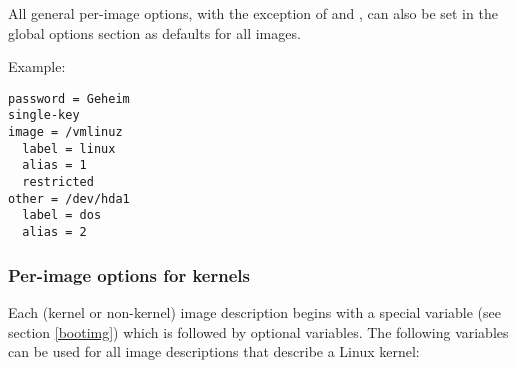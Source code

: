 All general per-image options, with the exception of  and
, can also be set in the global options section as defaults
for all images.

Example:
\begin{verbatim}
password = Geheim
single-key
image = /vmlinuz
  label = linux
  alias = 1
  restricted
other = /dev/hda1
  label = dos
  alias = 2
\end{verbatim}


\subsubsection{Per-image options for kernels}
\label{cfgkern}

Each (kernel or non-kernel)
image description begins with a special variable (see section \ref{bootimg})
which is followed by optional
variables.
The following variables can be used for all image descriptions
that describe a Linux kernel:

